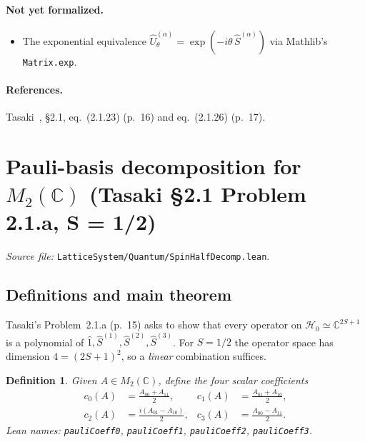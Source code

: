 \documentclass[a4paper,11pt]{article}
\newtheorem{definition}[theorem]{Definition}
\begin{document}
\paragraph{Not yet formalized.}
\begin{itemize}
  \item The exponential equivalence
    $\hat U^{(\alpha)}_\theta = \exp(-i\theta\,\hat S^{(\alpha)})$
    via Mathlib's \texttt{Matrix.exp}.
\end{itemize}

\paragraph{References.}
Tasaki~\cite{Tasaki:QMB}, §2.1, eq.~(2.1.23) (p.~16) and eq.~(2.1.26)
(p.~17).

\section{Pauli-basis decomposition for $M_2(\mathbb{C})$ (Tasaki §2.1 Problem 2.1.a, S = 1/2)}
\label{sec:spinhalfdecomp}

\emph{Source file:} \texttt{LatticeSystem/Quantum/SpinHalfDecomp.lean}.

\subsection{Definitions and main theorem}

Tasaki's Problem~2.1.a (p.~15) asks to show that every operator on
$\mathcal{H}_0 \simeq \mathbb{C}^{2S+1}$ is a polynomial of $\hat 1,
\hat S^{(1)}, \hat S^{(2)}, \hat S^{(3)}$. For $S = 1/2$ the operator
space has dimension $4 = (2S+1)^2$, so a \emph{linear} combination
suffices.

\begin{definition}
Given $A \in M_2(\mathbb{C})$, define the four scalar coefficients
\begin{align*}
  c_0(A) &= \tfrac{A_{00} + A_{11}}{2}, &
  c_1(A) &= \tfrac{A_{01} + A_{10}}{2}, \\
  c_2(A) &= \tfrac{i (A_{01} - A_{10})}{2}, &
  c_3(A) &= \tfrac{A_{00} - A_{11}}{2}.
\end{align*}
Lean names: \texttt{pauliCoeff0}, \texttt{pauliCoeff1},
\texttt{pauliCoeff2}, \texttt{pauliCoeff3}.
\end{definition}
\end{document}
